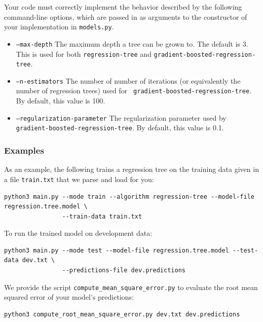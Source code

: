 \documentclass[11pt]{article}
\begin{document}
Your code must correctly implement the behavior described by the following
command-line options, which are passed in as arguments to the constructor of
your implementation in {\tt models.py}.
\begin{itemize}
\item {\tt --max-depth} The maximum depth a tree can be grown to. The default is
  3. This is used for both {\tt regression-tree} and
  \texttt{gradient-boosted-regression-tree}.
\item {\tt --n-estimators} The number of number of iterations (or equivalently
  the number of regression trees) used for {\tt
    gradient-boosted-regression-tree}. By default, this value is 100.
\item {\tt --regularization-parameter} The regularization parameter used by
  \\{\tt gradient-boosted-regression-tree}. By default, this value is 0.1.
\end{itemize}


\subsubsection{Examples}
As an example, the following trains a regression tree on the training data given
in a file {\tt train.txt} that we parse and load for you:
\begin{footnotesize}
\begin{verbatim}
python3 main.py --mode train --algorithm regression-tree --model-file regression.tree.model \
                --train-data train.txt
\end{verbatim}
\end{footnotesize}

\noindent To run the trained model on development data:
\begin{footnotesize}
\begin{verbatim}
python3 main.py --mode test --model-file regression.tree.model --test-data dev.txt \
                --predictions-file dev.predictions
\end{verbatim}
\end{footnotesize}

\noindent We provide the script {\tt compute\_mean\_square\_error.py} to
evaluate the root mean squared error of your model's predictions:
\begin{footnotesize}
\begin{verbatim}
python3 compute_root_mean_square_error.py dev.txt dev.predictions
\end{verbatim}
\end{footnotesize}
\end{document}
